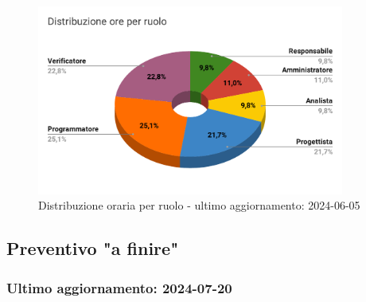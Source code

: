 \begin{figure}[H]
  \centering
  \includegraphics[width=0.90\textwidth]{assets/Preventivo/Totale/distribuzione_ore_ruolo.pdf}
  \caption{Distribuzione oraria per ruolo - ultimo aggiornamento: 2024-06-05}
\end{figure}

\subsection{Preventivo "a finire"}
\subsubsection{Ultimo aggiornamento: 2024-07-20}

